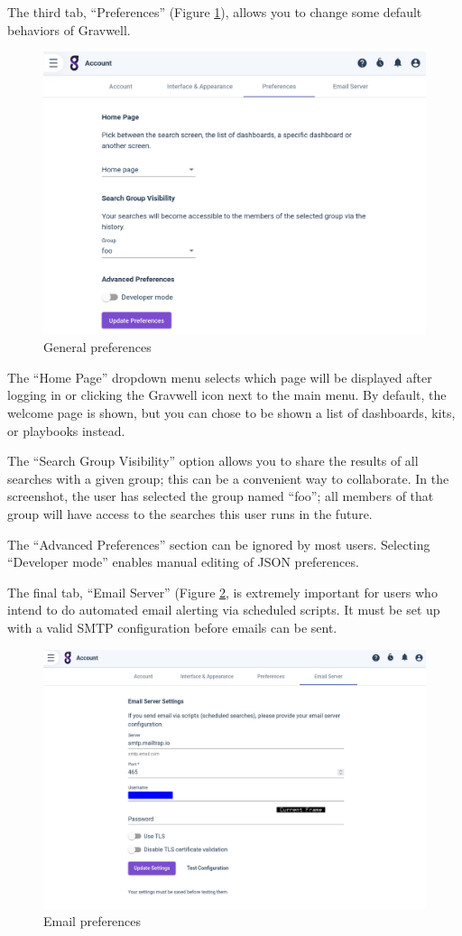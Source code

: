 The third tab, ``Preferences'' (Figure \ref{fig:general-prefs}), allows you to change some default behaviors of Gravwell.

\begin{figure}
	\includegraphics[width=0.7\linewidth]{images/general-prefs.png}
	\caption{General preferences}
	\label{fig:general-prefs}
\end{figure}


The ``Home Page'' dropdown menu selects which page will be displayed after logging in or clicking the Gravwell icon next to the main menu. By default, the welcome page is shown, but you can chose to be shown a list of dashboards, kits, or playbooks instead.

The ``Search Group Visibility'' option allows you to share the results of all searches with a given group; this can be a convenient way to collaborate. In the screenshot, the user has selected the group named ``foo''; all members of that group will have access to the searches this user runs in the future.

The ``Advanced Preferences'' section can be ignored by most users. Selecting ``Developer mode'' enables manual editing of JSON preferences.

The final tab, ``Email Server'' (Figure \ref{fig:email-prefs-gui}, is extremely important for users who intend to do automated email alerting via scheduled scripts. It must be set up with a valid SMTP configuration before emails can be sent.

\begin{figure}
	\includegraphics[width=0.7\linewidth]{images/email-prefs.png}
	\caption{Email preferences}
	\label{fig:email-prefs-gui}
\end{figure}


